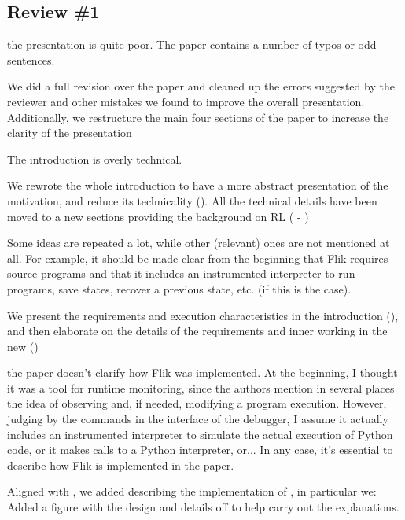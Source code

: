 \subsection{Review \#1}

\begin{remark} 
the presentation is quite poor. The paper contains a number of typos or odd sentences. 
\end{remark}
\begin{solved}
We did a full revision over the paper and cleaned up the errors suggested by the reviewer and other mistakes we found to improve the overall presentation. Additionally, we restructure the main four sections of the paper to increase the clarity of the presentation
\end{solved}

\begin{remark} \label{rem:intro}
The introduction is overly technical.
\end{remark}
\begin{solved}
We rewrote the whole introduction to have a more abstract presentation of the motivation, and reduce its technicality (). All the technical details have been moved to a new sections providing the background on \ac{RL} ( - )  
\end{solved}

\begin{remark} \label{rem:requirements}
Some ideas are repeated a lot, while other (relevant) ones are not mentioned at all. For example, it should be made clear from the beginning that Flik requires source programs and that it includes an instrumented interpreter to run programs, save states, recover a previous state, etc. (if this is the case).
\end{remark}
\begin{solved}
We present the requirements and execution characteristics in the introduction (), and then elaborate on the details of the requirements and inner working in the new   ()
\end{solved}

\begin{remark}\label{rem:implementation}
the paper doesn't clarify how Flik was implemented. At the beginning, I thought it was a tool for runtime monitoring, since the authors mention in several places the idea of observing and, if needed, modifying a program execution. However, judging by the commands in the interface of the debugger, I assume it actually includes an instrumented interpreter to simulate the actual execution of Python code, or it makes calls to a Python interpreter, or... In any case, it's essential to describe how Flik is implemented in the paper.
\end{remark}
\begin{solved}
Aligned with , we added  describing the implementation of \flik, in particular we: Added a figure with the design and details off \flik to help carry out the explanations.
\end{solved}

